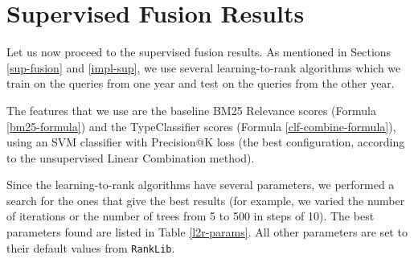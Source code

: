 \section{Supervised Fusion Results}
Let us now proceed to the supervised fusion results. As mentioned in Sections \ref{sup-fusion} and \ref{impl-sup}, we use several
learning-to-rank algorithms which we train on the queries from one year and test on the queries from the other year.

The features that we use are the baseline BM25 \textsf{Relevance} scores (Formula \ref{bm25-formula})
and the \textsf{TypeClassifier} scores (Formula \ref{clf-combine-formula}), using an SVM
classifier with Precision@K loss (the best configuration, according to the unsupervised Linear Combination method).

Since the learning-to-rank algorithms have several parameters, we performed a search for the ones that give the best
results (for example, we varied the number of iterations or the number of trees from 5 to 500 in steps of 10).
The best parameters found are listed in Table \ref{l2r-params}. All other parameters are set to their default values from \texttt{RankLib}.

\begin{table}
\centering
\caption{Best parameters found for the learning-to-rank algorithms.}
\label{l2r-params}
\end{table}

